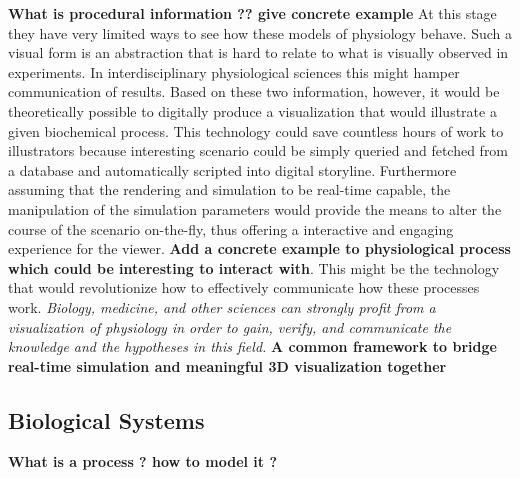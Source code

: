 \textbf{What is procedural information ?? give concrete example}
At this stage they have very limited ways to see how these models of physiology behave. 
Such a visual form is an abstraction that is hard to relate to what is visually observed in experiments. 
In interdisciplinary physiological sciences this might hamper communication of results. 
Based on these two information, however, it would be theoretically possible to digitally produce a visualization that would illustrate a given biochemical process.
This technology could save countless hours of work to illustrators because interesting scenario could be simply queried and fetched from a database and automatically scripted into digital storyline.
Furthermore assuming that the rendering and simulation to be real-time capable, the manipulation of the simulation parameters would provide the means to alter the course of the scenario on-the-fly, thus offering a interactive and engaging experience for the viewer.
\textbf{Add a concrete example to physiological process which could be interesting to interact with}.
This might be the technology that would revolutionize how to effectively communicate how these processes work.
\textit{Biology, medicine, and other sciences can strongly profit from a visualization of physiology in order to gain, verify, and communicate the knowledge and the hypotheses in this field.}
\textbf{A common framework to bridge real-time simulation and meaningful 3D visualization together}

%
%

\subsection{Biological Systems}

\textbf{What is a process ? how to model it ?}

